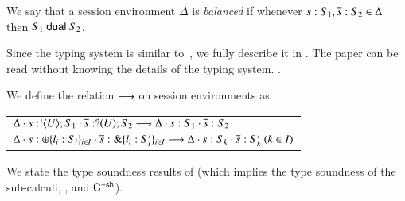 \smallskip

\begin{definition}[Balanced]\label{d:wtenv}%
	We say that a session environment $\Delta$ is {\em balanced} if whenever
	$s: S_1, \overline{s}: S_2 \in \Delta$ then $S_1 \ \mathsf{dual}\  S_2$.
\end{definition}

\smallskip

Since the typing system is similar to~\cite{tlca07,MostrousY15}, 
we fully describe it  in .  The %
paper can
be read without knowing the details of the typing system. 
.

\smallskip

\begin{definition}%
\label{def:ses_red}
We define the relation $\longrightarrow$ on session environments as:

\begin{tabular}{l}
	$\Delta \cdot s: ! \langle U \rangle ; S_1 \cdot \overline{s}: ? (U) ; S_2 \longrightarrow
	\Delta \cdot s: S_1 \cdot \overline{s}: S_2$\\[1mm]
	$\Delta \cdot s: \oplus \{l_i: S_i\}_{i \in I} \cdot \overline{s}: \& \{l_i: S_i'\}_{i \in I} \longrightarrow \Delta \cdot s: S_k \cdot \overline{s}: S_k' \ (k \in I)$
\end{tabular}
\end{definition}

\smallskip

\noi We state the type soundness results of \HOp (which implies 
the type soundness of the sub-calculi, \HO, \sessp and $\mathsf{C}^{-\mathsf{sh}}$). 


